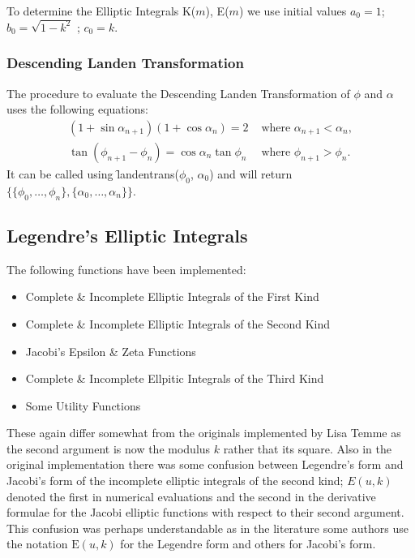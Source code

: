 To determine the Elliptic Integrals K($m$), E($m$) we use initial values
\(a_0 = 1\); \(b_0 = \sqrt{1-k^2}\) ; \(c_0 = k\).

\subsubsection{Descending Landen Transformation}
The procedure to evaluate the Descending Landen Transformation of
$\phi$ and $\alpha$ uses the following equations:
\begin{align*}
 (1+\sin \alpha_{n+1})(1+\cos \alpha_n)=2 &\text{ where } \alpha_{n+1}<\alpha_n, \\
  \tan(\phi_{n+1}-\phi_n)=\cos \alpha_n \tan \phi_n & \text{ where } \phi_{n+1}>\phi_n.
\end{align*}
It can be called using \f{landentrans}($\phi_0$, $\alpha_0$)
and will return \\
$\{\{\phi_0, \ldots ,\phi_n\},\{\alpha_0, \ldots ,\alpha_n\}\}$.

\subsection{Legendre's Elliptic Integrals}
\hypertarget{ELLIPI}{}
The following functions have been implemented:

\begin{itemize}
\item Complete \& Incomplete Elliptic Integrals of the First Kind
\item Complete \& Incomplete Elliptic Integrals of the Second Kind
\item Jacobi's Epsilon \& Zeta Functions
\item Complete \& Incomplete Ellpitic Integrals of the Third Kind
\item Some Utility Functions
\end{itemize}

These again differ somewhat from the originals implemented by Lisa Temme
as the second argument is now the modulus $k$ rather that its square.
Also in the original implementation  there was some confusion between
Legendre's form and Jacobi's form of the incomplete elliptic integrals of
the second kind; $E(u,k)$ denoted the first in numerical
evaluations and the second in the derivative formulae for the Jacobi
elliptic functions with respect to their second argument.
This confusion was perhaps understandable
as in the literature some authors use the notation $\mathrm{E}(u, k)$ for
the Legendre form and others for Jacobi's form.


